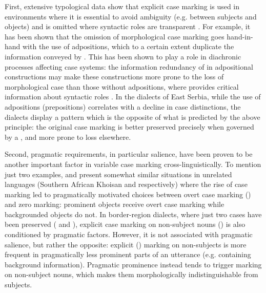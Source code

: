 \documentclass[output=paper,colorlinks,citecolor=brown]{langscibook}
\begin{document}
First, extensive typological data show that explicit case marking is used in environments where it is essential to avoid ambiguity (e.g. between subjects and objects) and is omitted where syntactic roles are transparent \citep{comrie1977}. For example, it has been shown that the omission of morphological case marking goes hand-in-hand with the use of adpositions, which to a certain extent duplicate the information conveyed by  . This has been shown to play a role in diachronic processes affecting case systems: the information redundancy of   in adpositional constructions may make these constructions more prone to the loss of morphological case than those without adpositions, where   provides critical information about syntactic roles \citep{hewsonbubenik2006}. In the dialects of East Serbia, while the use of adpositions (prepositions) correlates with a decline in case distinctions, the dialects display a pattern which is the opposite of what is predicted by the above principle: the original case marking is better preserved precisely when governed by a , and more prone to loss elsewhere.

{\sloppy Second, pragmatic requirements, in particular  salience, have been proven to be another important factor in variable case marking cross-linguistically. To mention just two examples, \citet{mcgregor2018} and \citet{montaut2018} present somewhat similar situations in unrelated languages (Southern African Khoisan and  respectively) where the rise of  case marking led to pragmatically motivated choices between overt case marking () and zero marking: prominent objects receive overt case marking while backgrounded objects do not. In  border-region dialects, where just two cases have been preserved ( and ), explicit case marking on non-subject nouns () is also conditioned by pragmatic factors. However, it is not associated with pragmatic salience, but rather the opposite: explicit () marking on non-subjects is more frequent in pragmatically less prominent parts of an utterance (e.g. containing background information). Pragmatic prominence instead tends to trigger  marking on non-subject nouns, which makes them morphologically indistinguishable from subjects.\par}
\end{document}
